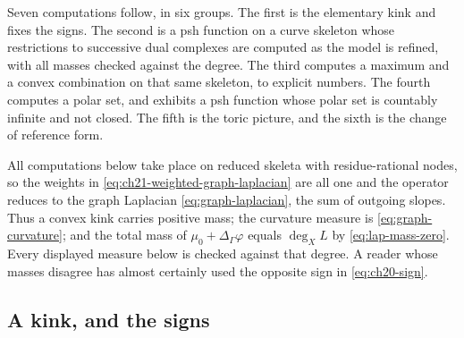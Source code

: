 Seven computations follow, in six groups.  The first is the elementary kink and fixes the
signs.  The second is a psh function on a curve skeleton whose restrictions
to successive dual complexes are computed as the model is refined, with all
masses checked against the degree.  The third computes a maximum and a
convex combination on that same skeleton, to explicit numbers.  The fourth
computes a polar set, and exhibits a psh function whose polar set is
countably infinite and not closed.  The fifth is the toric picture, and the
sixth is the change of reference form.

All computations below take place on reduced skeleta with residue-rational
nodes, so the weights in
\eqref{eq:ch21-weighted-graph-laplacian} are all one and the operator reduces
to the graph Laplacian \eqref{eq:graph-laplacian}, the sum of outgoing
slopes.  Thus a convex kink carries positive mass; the curvature measure is
\eqref{eq:graph-curvature}; and the total mass of
$\mu_0+\Delta_\Gamma\varphi$ equals $\deg_XL$ by
\eqref{eq:lap-mass-zero}.  Every displayed measure below is checked against
that degree.  A reader whose masses disagree has almost certainly used the
opposite sign in \eqref{eq:ch20-sign}.

\subsection{A kink, and the signs}
\label{sec:ch21-worked-kink}


